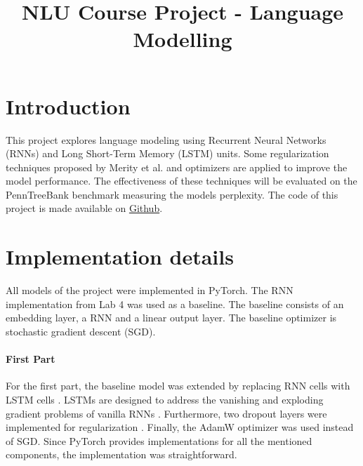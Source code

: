 \documentclass[a4paper]{article}
\title{NLU Course Project - Language Modelling}
\begin{document}
\maketitle


\section{Introduction}
This project explores language modeling using Recurrent Neural Networks (RNNs) and Long Short-Term Memory (LSTM) units. Some regularization techniques proposed by Merity et al. \cite{merity2017regularizing} and optimizers are applied to improve the model performance. The effectiveness of these techniques will be evaluated on the PennTreeBank benchmark measuring the models perplexity. The code of this project is made available on \href{
}{Github}.

\section{Implementation details}
\label{sec:implementation}
All models of the project were implemented in PyTorch. The RNN implementation from Lab 4 was used as a baseline. The baseline consists of an embedding layer, a RNN and a linear output layer. The baseline optimizer is stochastic gradient descent (SGD). 
\paragraph*{First Part}
For the first part, the baseline model was extended by replacing RNN cells with LSTM cells \cite{hochreiter1997long}. LSTMs are designed to address the vanishing and exploding gradient problems of vanilla RNNs \cite{sak2014long}. Furthermore, two dropout layers were implemented for regularization \cite{srivastava2014dropout}. Finally, the AdamW \cite{loshchilov2017decoupled} optimizer was used instead of SGD. Since PyTorch provides implementations for all the mentioned components, the implementation was straightforward.
\end{document}
